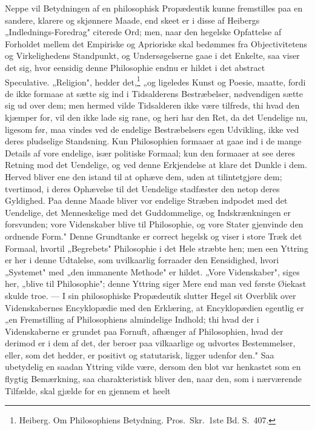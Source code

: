 \documentclass[12pt]{book}
\begin{document}
Neppe vil Betydningen af en philosophisk Propædeutik kunne fremstilles paa en
sandere, klarere og skjønnere Maade, end skeet er i disse af Heibergs
„Indlednings-Foredrag" citerede Ord; men, naar den hegelske Opfattelse af
Forholdet mellem det Empiriske og Aprioriske skal bedømmes fra Objectivitetens og
Virkelighedens Standpunkt, og Undersøgelserne gaae i det Enkelte, saa viser det
sig, hvor eensidig denne Philosophie endnu er hildet i det abstract Speculative.
„Religion", hedder det,\footnote{Heiberg. Om Philosophiens Betydning. Pros.\ Skr.\
1ste Bd. S.~407.} „og ligeledes Kunst og Poesie, maatte, fordi de ikke formaae at
sætte sig ind i Tidsalderens Bestræbelser, nødvendigen sætte sig ud over dem; men
hermed vilde Tidsalderen ikke være tilfreds, thi hvad den kjæmper for, vil den
ikke lade sig rane, og heri har den Ret, da det Uendelige nu, ligesom før, maa
vindes ved de endelige Bestræbelsers egen Udvikling, ikke ved deres pludselige
Standsning. Kun Philosophien formaaer at gaae ind i de mange Details af vore
endelige, især politiske Formaal; kun den formaaer at see deres Retning mod det
Uendelige, og ved denne Erkjendelse at klare det Dunkle i dem. Herved bliver ene
den istand til at ophæve dem, uden at tilintetgjøre dem; tvertimod, i deres
Ophævelse til det Uendelige stadfæster den netop deres Gyldighed. Paa denne Maade
bliver vor endelige Stræben indpodet med det Uendelige, det Menneskelige med det
Guddommelige, og Indskrænkningen er forsvunden; vore Videnskaber blive til
Philosophie, og vore Stater gjenvinde den ordnende Form."
Denne Grundtanke er correct hegelsk og viser i store Træk det Formaal, hvortil
„Begrebets" Philosophie i det Hele stræbte hen; men een Yttring er her i denne
Udtalelse, som uvilkaarlig forraader den Eensidighed, hvori „Systemet" med „den
immanente Methode" er hildet. „Vore Videnskaber", siges her, „blive til
Philosophie"; denne Yttring siger Mere end man ved første Øiekast skulde troe. ---
I sin philosophiske Propædeutik slutter Hegel sit Overblik over Videnskabernes
Encyklopædie med den Erklæring, at Encyklopædien egentlig er „en Fremstilling af
Philosophiens almindelige Indhold; thi hvad der i Videnskaberne er grundet paa
Fornuft, afhænger af Philosophien, hvad der derimod er i dem af det, der beroer paa
vilkaarlige og udvortes Bestemmelser, eller, som det hedder, er positivt og
statutarisk, ligger udenfor den." Saa ubetydelig en saadan Yttring vilde være,
dersom den blot var henkastet som en flygtig Bemærkning, saa charakteristisk bliver
den, naar den, som i nærværende Tilfælde, skal gjælde for en gjennem et heelt
\end{document}
